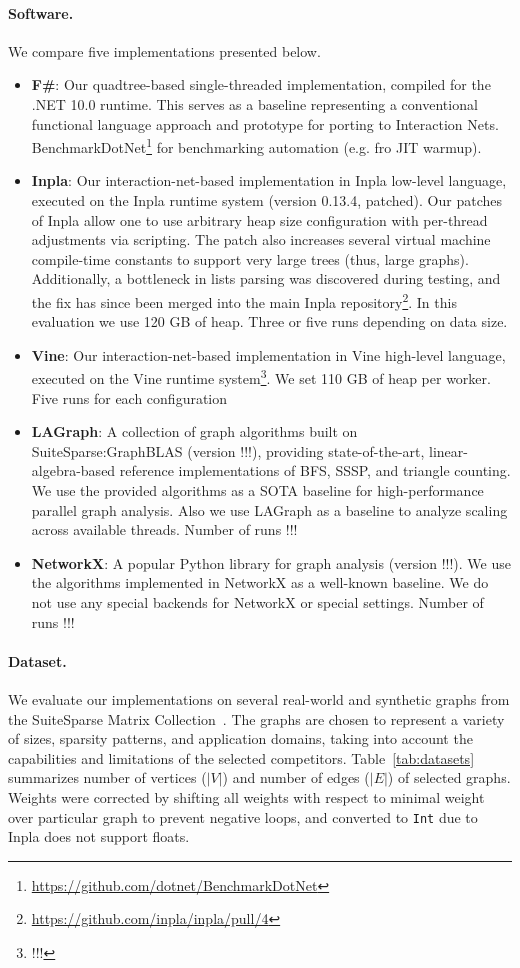 \paragraph{Software.}
We compare five implementations presented below.
\begin{itemize}
    \item \textbf{F\#}: Our quadtree-based single-threaded implementation, compiled for the .NET 10.0 runtime.
    This serves as a baseline representing a conventional functional language approach and prototype for porting to Interaction Nets.
    BenchmarkDotNet\footnote{\url{https://github.com/dotnet/BenchmarkDotNet}}\cite{!!!} for benchmarking automation (e.g. fro JIT warmup).
	\item \textbf{Inpla}: Our interaction-net-based implementation in Inpla low-level language, executed on the Inpla runtime system (version 0.13.4, patched).
	Our patches of Inpla allow one to use arbitrary heap size configuration with per-thread adjustments via scripting.
    The patch also increases several virtual machine compile-time constants to support very large trees (thus, large graphs).
    Additionally, a bottleneck in lists parsing was discovered during testing, and the fix has since been merged into the main Inpla repository\footnote{\url{https://github.com/inpla/inpla/pull/4}}.
    In this evaluation we use 120 GB of heap.
    Three or five runs depending on data size.
    \item \textbf{Vine}: Our interaction-net-based implementation in Vine high-level language, executed on the Vine runtime system\footnote{!!!}. We set 110 GB of heap per worker. Five runs for each configuration
    \item \textbf{LAGraph}: A collection of graph algorithms built on SuiteSparse:GraphBLAS (version !!!), providing state-of-the-art, linear-algebra-based reference implementations of BFS, SSSP, and triangle counting. We use the provided algorithms as a SOTA baseline for high-performance parallel graph analysis. Also we use LAGraph as a baseline to analyze scaling across available threads.
    Number of runs !!! 
    \item \textbf{NetworkX}: A popular Python library for graph analysis (version !!!).
    We use the algorithms implemented in NetworkX as a well-known baseline.
    We do not use any special backends for NetworkX or special settings.
    Number of runs !!!
\end{itemize}

\paragraph{Dataset.}
We evaluate our implementations on several real-world and synthetic graphs from the SuiteSparse Matrix Collection~\cite{Kolodziej2019}.
The graphs are chosen to represent a variety of sizes, sparsity patterns, and application domains, taking into account the capabilities and limitations of the selected competitors.
Table~\ref{tab:datasets} summarizes number of vertices (\(|V|\)) and number of edges (\(|E|\)) of selected graphs.
Weights were corrected by shifting all weights with respect to minimal weight over particular graph to prevent negative loops, and converted to \texttt{Int} due to Inpla does not support floats.

